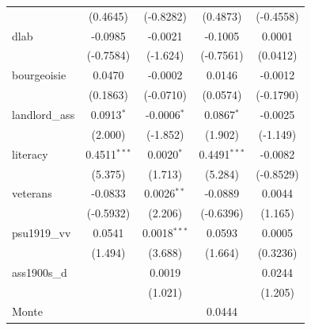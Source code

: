 \begin{table}[htbp]
\begin{tabular}{lcccc}
                                       & (0.4645)               & (-0.8282)              & (0.4873)               & (-0.4558)\\   
      dlab                             & -0.0985                & -0.0021                & -0.1005                & 0.0001\\   
                                       & (-0.7584)              & (-1.624)               & (-0.7561)              & (0.0412)\\   
      bourgeoisie                      & 0.0470                 & -0.0002                & 0.0146                 & -0.0012\\   
                                       & (0.1863)               & (-0.0710)              & (0.0574)               & (-0.1790)\\   
      landlord\_ass                    & 0.0913$^{*}$           & -0.0006$^{*}$          & 0.0867$^{*}$           & -0.0025\\   
                                       & (2.000)                & (-1.852)               & (1.902)                & (-1.149)\\   
      literacy                         & 0.4511$^{***}$         & 0.0020$^{*}$           & 0.4491$^{***}$         & -0.0082\\   
                                       & (5.375)                & (1.713)                & (5.284)                & (-0.8529)\\   
      veterans                         & -0.0833                & 0.0026$^{**}$          & -0.0889                & 0.0044\\   
                                       & (-0.5932)              & (2.206)                & (-0.6396)              & (1.165)\\   
      psu1919\_vv                      & 0.0541                 & 0.0018$^{***}$         & 0.0593                 & 0.0005\\   
                                       & (1.494)                & (3.688)                & (1.664)                & (0.3236)\\   
      ass1900s\_d                      &                        & 0.0019                 &                        & 0.0244\\   
                                       &                        & (1.021)                &                        & (1.205)\\   
      Monte                            &                        &                        & 0.0444                 &   \\   

\end{tabular}
\end{table}
